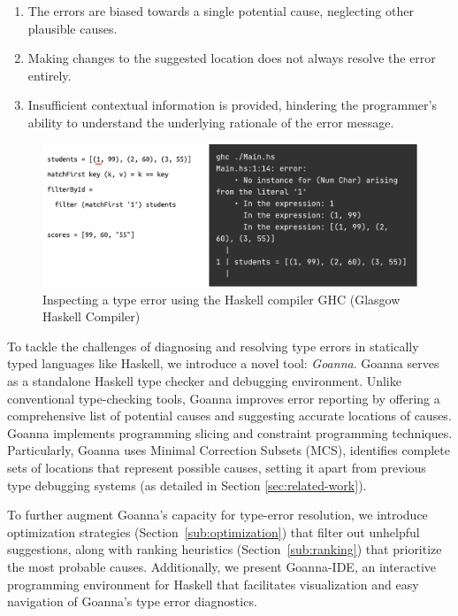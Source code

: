 \documentclass[pdflatex,sn-nature,Numbered]{sn-jnl}%
\begin{document}
\begin{enumerate}
    \item The errors are biased towards a single potential cause, neglecting other plausible causes.
    \item Making changes to the suggested location does not always resolve the error entirely.
    \item Insufficient contextual information is provided, hindering the programmer's ability to understand the underlying rationale of the error message.
\end{enumerate}


\begin{figure}[ht!]
    \centering
    \includegraphics[width=\linewidth]{images/motivation}
    \caption{Inspecting a type error using the Haskell compiler GHC (Glasgow Haskell Compiler)}
    \label{fig:motivation}
\end{figure}

To tackle the challenges of diagnosing and resolving type errors in statically typed languages like Haskell, we introduce a novel tool: \textit{Goanna}. Goanna serves as a standalone Haskell type checker and debugging environment. Unlike conventional type-checking tools, Goanna improves error reporting by offering a comprehensive list of potential causes and suggesting accurate locations of causes. Goanna implements programming slicing and constraint programming techniques. Particularly, Goanna uses  Minimal Correction Subsets (MCS), identifies complete sets of locations that represent possible causes, setting it apart from previous type debugging systems (as detailed in Section \ref{sec:related-work}).

To further augment Goanna's capacity for type-error resolution, we introduce optimization strategies (Section~\ref{sub:optimization}) that filter out unhelpful suggestions, along with ranking heuristics (Section~\ref{sub:ranking}) that prioritize the most probable causes. Additionally, we present Goanna-IDE, an interactive programming environment for Haskell that facilitates visualization and easy navigation of Goanna's type error diagnostics.
\end{document}
